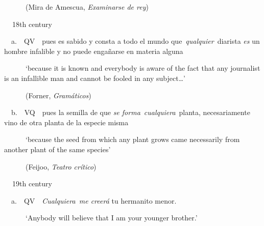 \begin{styleStandard}
\ \ \ \ \ \ (Mira de Amescua, \textit{Examinarse de rey})
\end{styleStandard}

\begin{styleStandard}
\textbf{\ \ }18th century
\end{styleStandard}

\begin{styleStandard}
\ \ a.\ \ QV\ \ pues es sabido y consta a todo el mundo que~\textit{qualquier}~diarista \textit{es} un hombre infalible y no puede engañarse en materia alguna 
\end{styleStandard}

\begin{styleStandard}
\ \ \ \ \ \ ‘because it is known and everybody is aware of the fact that any journalist is an infallible man and cannot be fooled in any subject…’
\end{styleStandard}

\begin{styleStandard}
\ \ \ \ \ \ (Forner, \textit{Gramáticos})
\end{styleStandard}

\begin{styleStandard}
\ \ b.\ \ VQ\ \ pues la semilla de que \textit{se forma}~\textit{cualquiera}~planta, necesariamente vino de otra planta de la especie misma 
\end{styleStandard}

\begin{styleStandard}
\ \ \ \ \ \ ‘because the seed from which any plant grows came necessarily from another plant of the same species’
\end{styleStandard}

\begin{styleStandard}
\ \ \ \ \ \ (Feijoo, \textit{Teatro crítico})
\end{styleStandard}

\begin{styleStandard}
\textbf{\ \ }19th century
\end{styleStandard}

\begin{styleStandard}
\ \ a.\ \ QV\ \ \textit{Cualquiera~me creerá} tu hermanito menor. 
\end{styleStandard}

\begin{styleStandard}
\ \ \ \ \ \ ‘Anybody will believe that I am your younger brother.’
\end{styleStandard}

